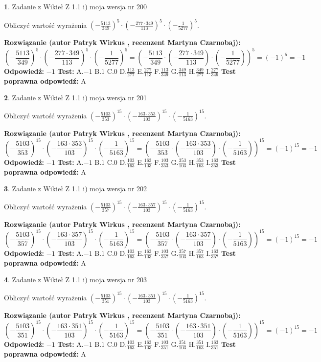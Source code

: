 \documentclass[12pt, a4paper]{article}
\theoremstyle{definition} %
\newtheorem{zad}{}
\newcommand{\zadStart}[1]{\begin{zad}#1\newline}
\newcommand{\zadStop}{\end{zad}}
\newcommand{\rozwStart}[2]{\noindent \textbf{Rozwiązanie (autor #1 , recenzent #2): }\newline}
\newcommand{\rozwStop}{\newline}
\newcommand{\odpStart}{\noindent \textbf{Odpowiedź:}\newline}
\newcommand{\odpStop}{\newline}
\newcommand{\testStart}{\noindent \textbf{Test:}\newline}
\newcommand{\testStop}{\newline}
\newcommand{\kluczStart}{\noindent \textbf{Test poprawna odpowiedź:}\newline}
\newcommand{\kluczStop}{\newline}
\begin{document}
\zadStart{Zadanie z Wikieł Z 1.1 i) moja wersja nr 200}

Obliczyć wartość wyrażenia $(-\frac{5113}{349})^{5} \cdot (-\frac{277 \cdot 349}{113})^{5} \cdot (-\frac{1}{5277})^{5}$.
\zadStop
\rozwStart{Patryk Wirkus}{Martyna Czarnobaj}
$$(-\frac{5113}{349})^{5} \cdot (-\frac{277 \cdot 349}{113})^{5} \cdot (-\frac{1}{5277})^{5} = (-\frac{5113}{349} \cdot (-\frac{277 \cdot 349}{113}) \cdot (-\frac{1}{5277}))^{5} = (-1)^{5} = -1$$
\rozwStop
\odpStart
$-1$
\odpStop
\testStart
A.$-1$ B.$1$ C.$0$ D.$\frac{113}{277}$ E.$\frac{277}{113}$
F.$\frac{113}{349}$ G.$\frac{349}{113}$
H.$\frac{349}{277}$
I.$\frac{277}{349}$
\testStop
\kluczStart
A
\kluczStop



\zadStart{Zadanie z Wikieł Z 1.1 i) moja wersja nr 201}

Obliczyć wartość wyrażenia $(-\frac{5103}{353})^{15} \cdot (-\frac{163 \cdot 353}{103})^{15} \cdot (-\frac{1}{5163})^{15}$.
\zadStop
\rozwStart{Patryk Wirkus}{Martyna Czarnobaj}
$$(-\frac{5103}{353})^{15} \cdot (-\frac{163 \cdot 353}{103})^{15} \cdot (-\frac{1}{5163})^{15} = (-\frac{5103}{353} \cdot (-\frac{163 \cdot 353}{103}) \cdot (-\frac{1}{5163}))^{15} = (-1)^{15} = -1$$
\rozwStop
\odpStart
$-1$
\odpStop
\testStart
A.$-1$ B.$1$ C.$0$ D.$\frac{103}{163}$ E.$\frac{163}{103}$
F.$\frac{103}{353}$ G.$\frac{353}{103}$
H.$\frac{353}{163}$
I.$\frac{163}{353}$
\testStop
\kluczStart
A
\kluczStop



\zadStart{Zadanie z Wikieł Z 1.1 i) moja wersja nr 202}

Obliczyć wartość wyrażenia $(-\frac{5103}{357})^{15} \cdot (-\frac{163 \cdot 357}{103})^{15} \cdot (-\frac{1}{5163})^{15}$.
\zadStop
\rozwStart{Patryk Wirkus}{Martyna Czarnobaj}
$$(-\frac{5103}{357})^{15} \cdot (-\frac{163 \cdot 357}{103})^{15} \cdot (-\frac{1}{5163})^{15} = (-\frac{5103}{357} \cdot (-\frac{163 \cdot 357}{103}) \cdot (-\frac{1}{5163}))^{15} = (-1)^{15} = -1$$
\rozwStop
\odpStart
$-1$
\odpStop
\testStart
A.$-1$ B.$1$ C.$0$ D.$\frac{103}{163}$ E.$\frac{163}{103}$
F.$\frac{103}{357}$ G.$\frac{357}{103}$
H.$\frac{357}{163}$
I.$\frac{163}{357}$
\testStop
\kluczStart
A
\kluczStop



\zadStart{Zadanie z Wikieł Z 1.1 i) moja wersja nr 203}

Obliczyć wartość wyrażenia $(-\frac{5103}{351})^{15} \cdot (-\frac{163 \cdot 351}{103})^{15} \cdot (-\frac{1}{5163})^{15}$.
\zadStop
\rozwStart{Patryk Wirkus}{Martyna Czarnobaj}
$$(-\frac{5103}{351})^{15} \cdot (-\frac{163 \cdot 351}{103})^{15} \cdot (-\frac{1}{5163})^{15} = (-\frac{5103}{351} \cdot (-\frac{163 \cdot 351}{103}) \cdot (-\frac{1}{5163}))^{15} = (-1)^{15} = -1$$
\rozwStop
\odpStart
$-1$
\odpStop
\testStart
A.$-1$ B.$1$ C.$0$ D.$\frac{103}{163}$ E.$\frac{163}{103}$
F.$\frac{103}{351}$ G.$\frac{351}{103}$
H.$\frac{351}{163}$
I.$\frac{163}{351}$
\testStop
\kluczStart
A
\kluczStop
\end{document}
